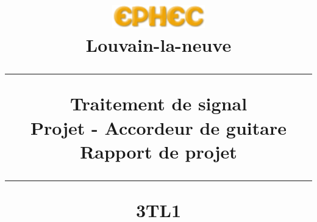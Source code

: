 \title{
\parbox{15cm}
{\includegraphics[width=4cm]{ephec.png} \\ 
  Louvain-la-neuve\\
  \vspace{3cm}
	\begin{center}\sf\bfseries\Huge
		\rule{15cm}{1pt}
		\medskip
		Traitement de signal\\
		\huge Projet - Accordeur de guitare\\
		\vspace{.5cm}
		\Large Rapport de projet
		\vspace{.5cm}
		\rule{15cm}{1pt}
		\large 3TL1
	\end{center}
	\vspace{3cm}
}} 